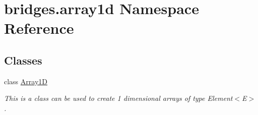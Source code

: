 \hypertarget{namespacebridges_1_1array1d}{}\section{bridges.\+array1d Namespace Reference}
\label{namespacebridges_1_1array1d}
\subsection*{Classes}
\begin{DoxyCompactItemize}
\item 
class \hyperlink{classbridges_1_1array1d_1_1_array1_d}{Array1D}
\begin{DoxyCompactList}\small\item\em This is a class can be used to create 1 dimensional arrays of type Element$<$\+E$>$. \end{DoxyCompactList}\end{DoxyCompactItemize}
